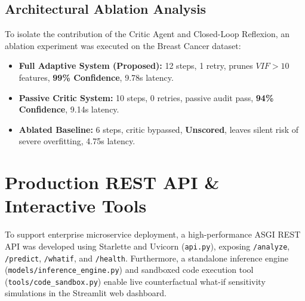 \documentclass[10pt,journal,compsoc]{IEEEtran}
\begin{document}
\begin{table}[t]
\centering
\caption{Empirical Multi-Agent Performance Across Real-World Benchmark Domains}
\label{tab:benchmarks}
\end{table}

\subsection{Architectural Ablation Analysis}
To isolate the contribution of the Critic Agent and Closed-Loop Reflexion, an ablation experiment was executed on the Breast Cancer dataset:
\begin{itemize}
    \item \textbf{Full Adaptive System (Proposed):} 12 steps, 1 retry, prunes $VIF > 10$ features, \textbf{99\% Confidence}, 9.78s latency.
    \item \textbf{Passive Critic System:} 10 steps, 0 retries, passive audit pass, \textbf{94\% Confidence}, 9.14s latency.
    \item \textbf{Ablated Baseline:} 6 steps, critic bypassed, \textbf{Unscored}, leaves silent risk of severe overfitting, 4.75s latency.
\end{itemize}

\section{Production REST API \& Interactive Tools}
To support enterprise microservice deployment, a high-performance ASGI REST API was developed using Starlette and Uvicorn (\texttt{api.py}), exposing \texttt{/analyze}, \texttt{/predict}, \texttt{/whatif}, and \texttt{/health}. Furthermore, a standalone inference engine (\texttt{models/inference\_engine.py}) and sandboxed code execution tool (\texttt{tools/code\_sandbox.py}) enable live counterfactual what-if sensitivity simulations in the Streamlit web dashboard.
\end{document}
